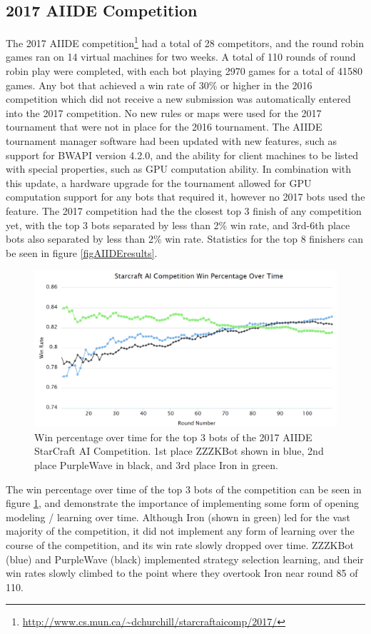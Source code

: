 \subsection{2017 AIIDE Competition}\label{subsecAIIDEnews}

The 2017 AIIDE competition\footnote{\url{http://www.cs.mun.ca/~dchurchill/starcraftaicomp/2017/}} had a total of 28 competitors, and the round robin games ran on 14 virtual machines for two weeks. A total of 110 rounds of round robin play were completed, with each bot playing 2970 games for a total of 41580 games. Any bot that achieved a win rate of 30\% or higher in the 2016 competition which did not receive a new submission was automatically entered into the 2017 competition. No new rules or maps were used for the 2017 tournament that were not in place for the 2016 tournament. The AIIDE tournament manager software had been updated with new features, such as support for BWAPI version 4.2.0, and the ability for client machines to be listed with special properties, such as GPU computation ability. In combination with this update, a hardware upgrade for the tournament allowed for GPU computation support for any bots that required it, however no 2017 bots used the feature. The 2017 competition had the the closest top 3 finish of any competition yet, with the top 3 bots separated by less than 2\% win rate, and 3rd-6th place bots also separated by less than 2\% win rate. Statistics for the top 8 finishers can be seen in figure \ref{figAIIDEresults}.

\begin{figure}[t]
  \centering
  \includegraphics[width=1\columnwidth]{fig/aiideWinPerc.png}
  \caption{Win percentage over time for the top 3 bots of the 2017 AIIDE StarCraft AI Competition. 1st place ZZZKBot shown in blue, 2nd place PurpleWave in black, and 3rd place Iron in green. }
  \label{aiideWinPerc}
\end{figure}

The win percentage over time of the top 3 bots of the competition can be seen in figure \ref{aiideWinPerc}, and demonstrate the importance of implementing some form of opening modeling / learning over time. Although Iron (shown in green) led for the vast majority of the competition, it did not implement any form of learning over the course of the competition, and its win rate slowly dropped over time. ZZZKBot (blue) and PurpleWave (black) implemented strategy selection learning, and their win rates slowly climbed to the point where they overtook Iron near round 85 of 110. 